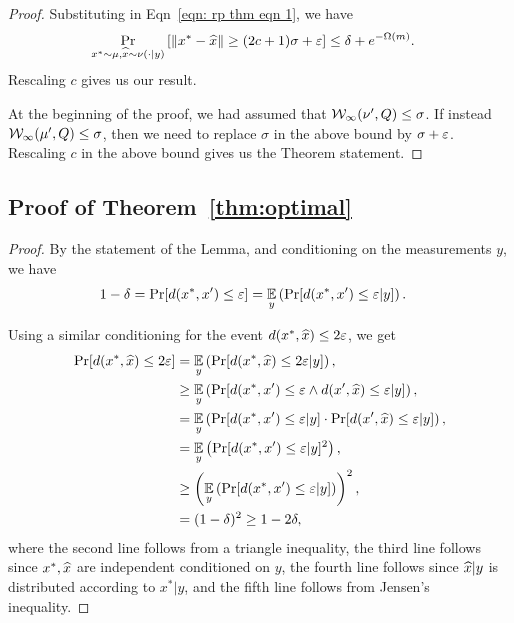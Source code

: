 \begin{proof}
		Substituting in Eqn~\eqref{eqn: rp thm eqn 1}, we have
		\begin{align*}
			\Pr_{x^*\sim \mu, \widehat{x} \sim \nu( \cdot | y)}\left[\| x^* - \widehat{x} \| \geq (2c+1)\sigma + \varepsilon \right] & \leq \delta +   e^{-\Omega(m)}.
		\end{align*}
		Rescaling $c$ gives us our result.
		
		At the beginning of the proof, we had assumed that $\mathcal W_\infty(\nu',Q)\leq \sigma$.
		If instead $\mathcal W_\infty(\mu',Q) \leq \sigma$, then we need to replace $\sigma$ in the above bound by $\sigma + \varepsilon$.
		Rescaling $c$ in the above bound gives us the Theorem statement.

\end{proof}

\subsection{Proof of Theorem~\ref{thm:optimal}}
\begin{proof}
By the statement of the Lemma, and conditioning on the measurements $y$, we have
\begin{align*}
    1 - \delta = \Pr[ d(x^* , x') \leq \varepsilon ] &= \operatorname*{\mathbb{E}}_{y } \left( \Pr[d(x^* , x') \leq \varepsilon | y ] \right).
\end{align*}

Using a similar conditioning for the event $d(x^* , \widehat{x}) \leq 2 \varepsilon$, we get
\begin{align*}
    \Pr[ d(x^* , \widehat{x}) \leq 2\varepsilon ] &= \operatorname*{\mathbb{E}}_{y} \left( \Pr[ d(x^* , \widehat{x}) \leq 2\varepsilon | y ] \right),\\ 
   &\geq \operatorname*{\mathbb{E}}_{y}  \left( \Pr[d(x^* , x') \leq \varepsilon  \land d(x' , \widehat{x}) \leq \varepsilon  | y ] \right),\\ 
   &= \operatorname*{\mathbb{E}}_{y}  \left( \Pr[ d(x^* , x') \leq \varepsilon | y ] \cdot \Pr[ d(x' , \widehat{x}) \leq \varepsilon  | y ] \right),\\ 
   &= \operatorname*{\mathbb{E}}_{y}  \left( \Pr[ d(x^* , x') \leq \varepsilon | y ]^2  \right),\\ 
   &\geq \left(\operatorname*{\mathbb{E}}_{y}  \left( \Pr[d(x^* , x') \leq \varepsilon | y ]  \right)\right)^2,\\ 
   &= (1-\delta)^2 \geq 1 - 2\delta,
\end{align*}
where the second line follows from a triangle inequality, the third line follows since $x^*, \widehat{x}$ are independent conditioned on $y$, the fourth line follows since $\widehat{x}|y$ is distributed according to $x^* | y$, and the fifth line follows from Jensen's inequality.

\end{proof}



